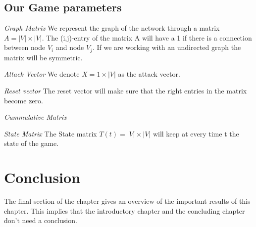 \begin{description}
\subsection{Our Game parameters}
\begin{description}
\item \textit{Graph Matrix} We represent the graph of the network through a matrix $ A = |V| \times |V|$. The (i,j)-entry of the matrix A will have a 1 if there is a connection between node $V_{i}$ and node $V_{j}$. If we are working with an undirected graph the matrix will be symmetric. 
\item \textit{Attack Vector} We denote $X = 1 \times |V|$ as the attack vector.  
\item \textit{Reset vector} The reset vector will make sure that the right entries in the matrix become zero.
\item \textit{Cummulative Matrix} 
\item \textit{State Matrix} The State matrix $T(t) = |V| \times |V| $ will keep at every time t the state of the game.
\end{description}

\end{description}


\section{Conclusion}
The final section of the chapter gives an overview of the important results
of this chapter. This implies that the introductory chapter and the
concluding chapter don't need a conclusion.



